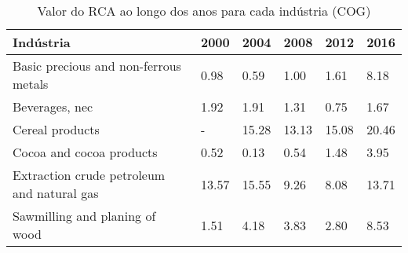 \begin{table}
\centering
\caption{Valor do RCA ao longo dos anos para cada indústria (COG)}
\begin{tabular}{p{6cm}p{1.5cm}p{1.5cm}p{1.5cm}p{1.5cm}p{1.5cm}}
\toprule
                                 Indústria &  2000 &  2004 &  2008 &  2012 &  2016 \\
\midrule
     Basic precious and non-ferrous metals &  0.98 &  0.59 &  1.00 &  1.61 &  8.18 \\
                            Beverages, nec &  1.92 &  1.91 &  1.31 &  0.75 &  1.67 \\
                           Cereal products &     - & 15.28 & 13.13 & 15.08 & 20.46 \\
                  Cocoa and cocoa products &  0.52 &  0.13 &  0.54 &  1.48 &  3.95 \\
Extraction crude petroleum and natural gas & 13.57 & 15.55 &  9.26 &  8.08 & 13.71 \\
            Sawmilling and planing of wood &  1.51 &  4.18 &  3.83 &  2.80 &  8.53 \\
\bottomrule
\end{tabular}
\end{table}

